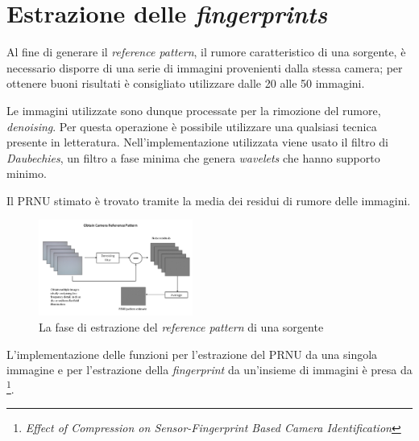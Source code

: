 \section{Estrazione delle \emph{fingerprints}}

Al fine di generare il \emph{reference pattern}, il rumore caratteristico di una sorgente, è necessario disporre di una serie di immagini provenienti dalla stessa camera; per ottenere buoni risultati è consigliato utilizzare dalle 20 alle 50 immagini.

Le immagini utilizzate sono dunque processate per la rimozione del rumore, \emph{denoising}. Per questa operazione è possibile utilizzare una qualsiasi tecnica presente in letteratura. Nell'implementazione utilizzata viene usato il filtro di \emph{Daubechies}\cite{Daubechies:1992:TLW:130655}, un filtro a fase minima che genera \emph{wavelets} che hanno supporto minimo. 

Il PRNU stimato è trovato tramite la media dei residui di rumore delle immagini. 

\begin{figure}[h]
\begin{center}
\includegraphics[width=0.45\textwidth]{images/prnu_extraction.jpg}
\end{center}
  \caption{La fase di estrazione del \emph{reference pattern} di una sorgente\cite{figprnu}}
\label{fig:extraction}
\end{figure}

L'implementazione delle funzioni per l'estrazione del PRNU da una singola immagine e per l'estrazione della \emph{fingerprint} da un'insieme di immagini è presa da \cite{goljan2016effect}\footnote{\emph{Effect of Compression on Sensor-Fingerprint Based Camera Identification}}.